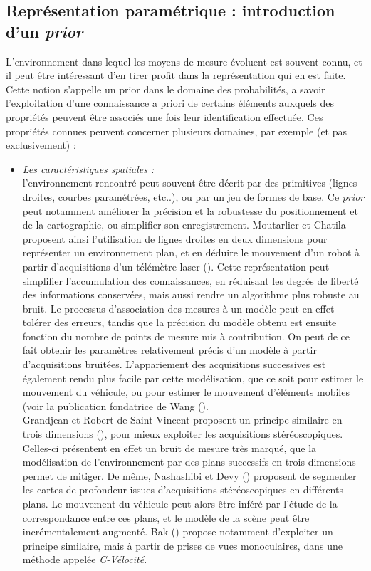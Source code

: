 \subsection{Représentation paramétrique : introduction d'un \textit{prior}} \label{sec:ch2_représentation_paramétrique} %
L'environnement dans lequel les moyens de mesure évoluent est souvent connu, et il peut être intéressant d'en tirer profit dans la représentation qui en est faite. Cette notion s'appelle un \og prior\fg{} dans le domaine des probabilités, a savoir l'exploitation d'une connaissance a priori de certains éléments auxquels des propriétés peuvent être associés une fois leur identification effectuée. Ces propriétés connues peuvent concerner plusieurs domaines, par exemple (et pas exclusivement) : 
\begin{itemize}
	\item {\textit{Les caractéristiques spatiales : }\\}
	l'environnement rencontré peut souvent être décrit par des primitives (lignes droites, courbes paramétrées, etc..), ou par un jeu de formes de base. Ce \textit{prior} peut notamment améliorer la précision et la robustesse du positionnement et de la cartographie, ou simplifier son enregistrement. Moutarlier et Chatila proposent ainsi l'utilisation de lignes droites en deux dimensions pour représenter un environnement plan, et en déduire le mouvement d'un robot à partir d'acquisitions d'un télémètre laser (\cite{Moutarlier1990a}). Cette représentation peut simplifier l'accumulation des connaissances, en réduisant les degrés de liberté des informations conservées, mais aussi rendre un algorithme plus robuste au bruit. Le processus d'association des mesures à un modèle peut en effet tolérer des erreurs, tandis que la précision du modèle obtenu est ensuite fonction du nombre de points de mesure mis à contribution. On peut de ce fait obtenir les paramètres relativement précis d'un modèle à partir d'acquisitions bruitées. L'appariement des acquisitions successives est également rendu plus facile par cette modélisation, que ce soit pour estimer le mouvement du véhicule, ou pour estimer le mouvement d'éléments mobiles (voir la publication fondatrice de Wang (\cite{Wang2004}). \\
	Grandjean et Robert de Saint-Vincent proposent un principe similaire en trois dimensions (\cite{Grandjean1989}), pour mieux exploiter les acquisitions stéréoscopiques. Celles-ci présentent en effet un bruit de mesure très marqué, que la modélisation de l'environnement par des plans successifs en trois dimensions permet de mitiger. De même, Nashashibi et Devy (\cite{Nashashibi1993}) proposent de segmenter les cartes de profondeur issues d'acquisitions stéréoscopiques en différents plans. Le mouvement du véhicule peut alors être inféré par l'étude de la correspondance entre ces plans, et le modèle de la scène peut être incrémentalement augmenté. Bak (\cite{Bak2011}) propose notamment d'exploiter un principe similaire, mais à partir de prises de vues monoculaires, dans une méthode appelée \textit{C-Vélocité}.\\

\end{itemize}
